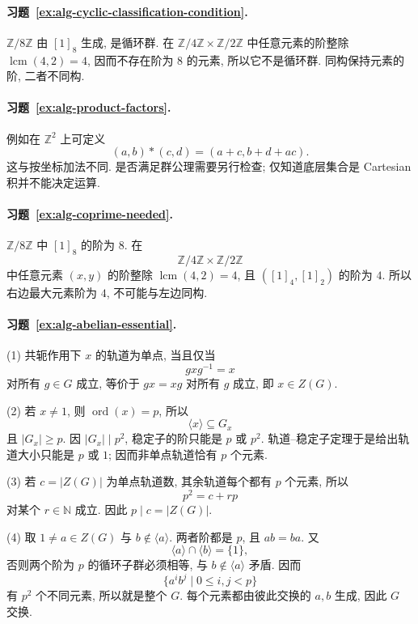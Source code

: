 \documentclass[usesamecnt, thmcnt=section, lang=cn, newtx, 10pt, scheme=chinese]{elegantbook}
\begin{document}
\paragraph*{习题~\ref{ex:alg-cyclic-classification-condition}.}
$\mathbb Z/8\mathbb Z$ 由 $[1]_8$ 生成, 是循环群. 在 $\mathbb Z/4\mathbb Z\times\mathbb Z/2\mathbb Z$ 中任意元素的阶整除 $\operatorname{lcm}(4,2)=4$, 因而不存在阶为 $8$ 的元素, 所以它不是循环群. 同构保持元素的阶, 二者不同构.

\paragraph*{习题~\ref{ex:alg-product-factors}.}
例如在 $\mathbb Z^2$ 上可定义
\[
 (a,b)*(c,d)=(a+c,b+d+ac).
\]
这与按坐标加法不同. 是否满足群公理需要另行检查; 仅知道底层集合是 Cartesian 积并不能决定运算.

\paragraph*{习题~\ref{ex:alg-coprime-needed}.}
$\mathbb Z/8\mathbb Z$ 中 $[1]_8$ 的阶为 $8$. 在
\[
 \mathbb Z/4\mathbb Z\times\mathbb Z/2\mathbb Z
\]
中任意元素 $(x,y)$ 的阶整除 $\operatorname{lcm}(4,2)=4$, 且 $([1]_4,[1]_2)$ 的阶为 $4$. 所以右边最大元素阶为 $4$, 不可能与左边同构.

\paragraph*{习题~\ref{ex:alg-abelian-essential}.}
(1) 共轭作用下 $x$ 的轨道为单点, 当且仅当
\[
 gxg^{-1}=x
\]
对所有 $g\in G$ 成立, 等价于 $gx=xg$ 对所有 $g$ 成立, 即 $x\in Z(G)$.

(2) 若 $x\neq1$, 则 $\operatorname{ord}(x)=p$, 所以
\[
 \langle x\rangle\subseteq G_x
\]
且 $|G_x|\geq p$. 因 $|G_x|\mid p^2$, 稳定子的阶只能是 $p$ 或 $p^2$. 轨道--稳定子定理于是给出轨道大小只能是 $p$ 或 $1$; 因而非单点轨道恰有 $p$ 个元素.

(3) 若 $c=|Z(G)|$ 为单点轨道数, 其余轨道每个都有 $p$ 个元素, 所以
\[
 p^2=c+rp
\]
对某个 $r\in\mathbb N$ 成立. 因此 $p\mid c=|Z(G)|$.

(4) 取 $1\neq a\in Z(G)$ 与 $b\notin\langle a\rangle$. 两者阶都是 $p$, 且 $ab=ba$. 又
\[
 \langle a\rangle\cap\langle b\rangle=\{1\},
\]
否则两个阶为 $p$ 的循环子群必须相等, 与 $b\notin\langle a\rangle$ 矛盾. 因而
\[
 \{a^ib^j\mid0\leq i,j<p\}
\]
有 $p^2$ 个不同元素, 所以就是整个 $G$. 每个元素都由彼此交换的 $a,b$ 生成, 因此 $G$ 交换.
\end{document}
